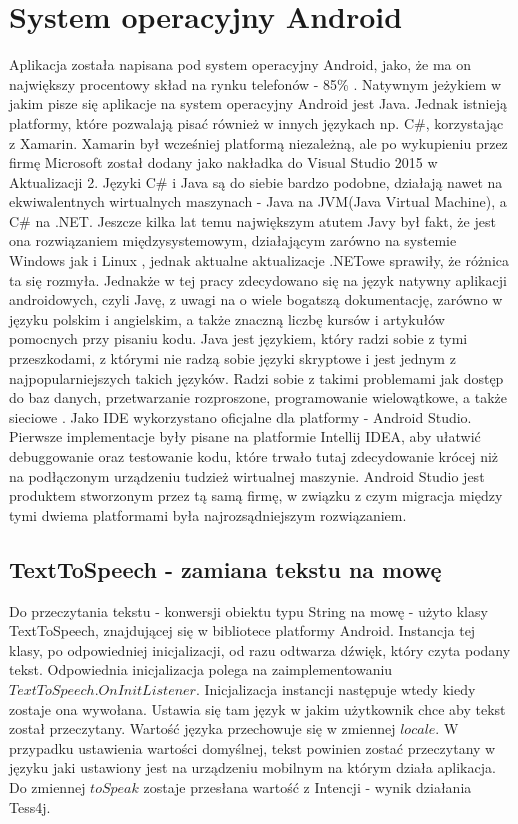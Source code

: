 \documentclass[eng,oneside]{mgr}
\begin{document}
\section{System operacyjny Android}
Aplikacja została napisana pod system operacyjny Android, jako, że ma on największy procentowy skład na rynku telefonów - 85\% \cite{procenty}. Natywnym jeżykiem w jakim pisze się aplikacje na system operacyjny Android jest Java. Jednak istnieją platformy, które pozwalają pisać również w innych językach np. C\#, korzystając z Xamarin. Xamarin był wcześniej platformą niezależną, ale po wykupieniu przez firmę Microsoft został dodany jako nakładka do Visual Studio 2015 w Aktualizacji 2. Języki C\# i Java są do siebie bardzo podobne, działają nawet na ekwiwalentnych wirtualnych maszynach - Java na JVM(Java Virtual Machine), a C\# na .NET. Jeszcze kilka lat temu największym atutem Javy był fakt, że jest ona rozwiązaniem międzysystemowym, działającym zarówno na systemie Windows jak i Linux \cite{thinking}, jednak aktualne aktualizacje .NETowe sprawiły, że różnica ta się rozmyła. Jednakże w tej pracy zdecydowano się na język natywny aplikacji androidowych, czyli Javę, z uwagi na o wiele bogatszą dokumentację, zarówno w języku polskim i angielskim, a także znaczną liczbę kursów i artykułów pomocnych przy pisaniu kodu. Java jest językiem, który radzi sobie z tymi przeszkodami, z którymi nie radzą sobie języki skryptowe i jest jednym z najpopularniejszych takich języków. Radzi sobie z takimi problemami jak dostęp do baz danych, przetwarzanie rozproszone, programowanie wielowątkowe, a także sieciowe \cite{java}. Jako IDE wykorzystano oficjalne dla platformy - Android Studio. Pierwsze implementacje były pisane na platformie Intellij IDEA, aby ułatwić debuggowanie oraz testowanie kodu, które trwało tutaj zdecydowanie krócej niż na podłączonym urządzeniu tudzież wirtualnej maszynie. Android Studio jest produktem stworzonym przez tą samą firmę, w związku z czym migracja między tymi dwiema platformami była najrozsądniejszym rozwiązaniem.
\subsection{TextToSpeech - zamiana tekstu na mowę}
Do przeczytania tekstu - konwersji obiektu typu String na mowę - użyto klasy TextToSpeech, znajdującej się w bibliotece platformy Android. Instancja tej klasy, po odpowiedniej inicjalizacji, od razu odtwarza dźwięk, który czyta podany tekst. Odpowiednia inicjalizacja polega na zaimplementowaniu $TextToSpeech.OnInitListener$\cite{texttospeech}. Inicjalizacja instancji następuje wtedy kiedy zostaje ona wywołana. Ustawia się tam język w jakim użytkownik chce aby tekst został przeczytany. Wartość języka przechowuje się w zmiennej $locale$. W przypadku ustawienia wartości domyślnej, tekst powinien zostać przeczytany w języku jaki ustawiony jest na urządzeniu mobilnym na którym działa aplikacja. Do zmiennej $toSpeak$ zostaje przesłana wartość z Intencji - wynik działania Tess4j.
\end{document}
